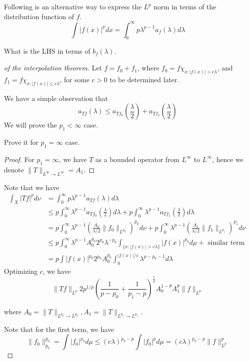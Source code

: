 \begin{corollary}
    Following is an alternative way to express the $L^p$ norm in terms of the distribution function of $f$.
    \begin{equation*}
        \int|f(x)|^pdx=\int_0^\infty p\lambda^{p-1}a_{f}(\lambda)d\lambda
    \end{equation*}
\end{corollary}
\begin{exercise}
    What is the LHS in terms of $b_f(\lambda)$.
\end{exercise}
\begin{proof}[of the interpolation theorem]

Let $f=f_0+f_1$, where $f_0=f\chi_{x:|f(x)|>c\lambda}$, and $f_1=f\chi_{x:|f(x)|\leq c\lambda}$, for some $c>0$ to be determined later.

We have a simple observation that
\begin{equation*}
    a_{Tf}(\lambda)\leq a_{Tf_0}\left(\frac{\lambda}{2} \right)+a_{Tf_1}\left(\frac{\lambda}{2} \right)
\end{equation*}
We will prove the $p_1<\infty$ case.
\begin{exercise}
    Prove it for $p_1=\infty$ case.
\end{exercise}
\begin{proof}
    For $p_1=\infty$, we have $T$ as a bounded operator from $L^\infty$ to $L^\infty$, hence we denote $\|T\|_{L^\infty\to L^\infty}=A_1$. 


\end{proof}


Note that we have
\begin{align*}
    \int_X|Tf|^pd\nu&=\int_0^\infty p\lambda^{p-1}a_{Tf}(\lambda)d\lambda\\
    &\leq p\int_0^\infty\lambda^{p-1}a_{Tf_0}\left(\frac{\lambda}{2} \right)d\lambda+p\int_0^\infty\lambda^{p-1}a_{Tf_1}\left(\frac{\lambda}{2} \right)d\lambda\\
    &=p\int_0^\infty\lambda^{p-1}\left(\frac{A_0}{\lambda/2}\|f_0\|_{L^{p_0}} \right)^{p_0}d\nu+p\int_0^\infty\lambda^{p-1}\left(\frac{A_1}{\lambda/2}\|f_1\|_{L^{p_1}} \right)^{p_1}d\nu\\
    &\leq p\int_0^\infty \lambda^{p-1}A_0^{p_0}2^{p_0}\lambda^{-p_0}\int_{\{x: |f(x)|>c\lambda\}}|f(x)|^{p_0}d\mu+\text{ similar term }\\
    &=p\int |f(x)|^{p_0}2^{p_0}A_0^{p_0}\int_0^{|f(x)|/c}\lambda^{p-p_0-1}d\lambda
\end{align*}
Optimizing $c$, we have
\begin{equation*}
    \|Tf\|_{L^p}2p^{1/p}\left(\frac{1}{p-p_0}+\frac{1}{p_1-p} \right)^\frac{1}{p}A_0^{1-\theta}A_1^\theta\|f\|_{L^p}
\end{equation*}

where $A_0=\|T\|_{L^{p_0}\to L^{p_0}}, A_1=\|T\|_{L^{p_1}\to L^{p_1}}$.


Note that for the first term, we have
\begin{equation*}
    \|f_0\|_{p_0}^{p_0}=\int|f_0|^{p_0}d\mu\leq (c\lambda)^{p_0-p}\int|f_0|^pd\mu=(c\lambda)^{p_0-p}\|f\|_{L^p}^p
\end{equation*}

\end{proof}

